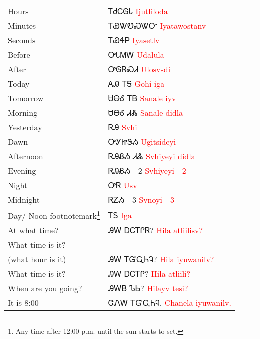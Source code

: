 \begin{minipage}{\linewidth}
\begin{tabular}{p{3cm} p{11cm}}
Hours & ᎢᏧᏟᎶᏓ 
 \newline \textcolor{red}{Ijutliloda}\\
Minutes & ᎢᏯᏔᏬᏍᏔᏅ 
 \newline \textcolor{red}{Iyatawostanv}\\
Seconds & ᎢᏯᏎᏢ 
 \newline \textcolor{red}{Iyasetlv}\\
Before & ᎤᏓᎷᎳ 
 \newline \textcolor{red}{Udalula}\\
After & ᎤᎶᏒᏍᏗ 
 \newline \textcolor{red}{Ulosvsdi}\\
Today & ᎪᎯ ᎢᎦ 
 \newline \textcolor{red}{Gohi iga}\\
Tomorrow & ᏌᎾᎴ ᎢᏴ 
 \newline \textcolor{red}{Sanale iyv}\\
Morning & ᏌᎾᎴ ᏗᏜ 
 \newline \textcolor{red}{Sanale didla}\\
Yesterday & ᏒᎯ 
 \newline \textcolor{red}{Svhi}\\
Dawn & ᎤᎩᏥᏕᏱ 
 \newline \textcolor{red}{Ugitsideyi}\\
Afternoon & ᏒᎯᏰᏱ ᏗᏜ 
 \newline \textcolor{red}{Svhiyeyi didla}\\
Evening & ᏒᎯᏰᏱ - 2 
 \newline \textcolor{red}{Svhiyeyi - 2}\\
Night & ᎤᏒ 
 \newline \textcolor{red}{Usv}\\
Midnight & ᏒᏃᏱ - 3 
 \newline \textcolor{red}{Svnoyi - 3}\\
Day/ Noon footnotemark\footnote{Any time after 12:00 p.m. until the sun starts to set.} & ᎢᎦ 
 \newline \textcolor{red}{Iga}\\
At what time? & ᎯᎳ ᎠᏟᎢᎵᏒ? 
 \newline \textcolor{red}{Hila atliilisv?}\\
What time is it?\\ (what hour is it) & ᎯᎳ ᎢᏳᏩᏂᎸ? 
 \newline \textcolor{red}{Hila iyuwanilv?}\\
What time is it? & ᎯᎳ ᎠᏟᎢᎵ? 
 \newline \textcolor{red}{Hila atliili?}\\
When are you going? & ᎯᎳᏴ ᏖᏏ? 
 \newline \textcolor{red}{Hilayv tesi?}\\
It is 8:00 & ᏣᏁᎳ ᎢᏳᏩᏂᎸ. 
 \newline \textcolor{red}{Chanela iyuwanilv.}\\
\end{tabular}
\end{minipage}
